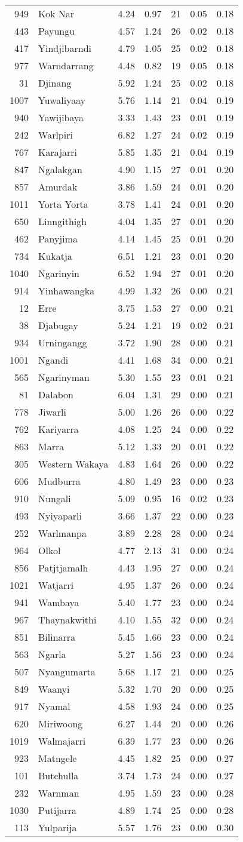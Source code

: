 \begin{longtable}[]{@{}rlrrrrr@{}}
949 & Kok Nar & 4.24 & 0.97 & 21 & 0.05 & 0.18\tabularnewline
443 & Payungu & 4.57 & 1.24 & 26 & 0.02 & 0.18\tabularnewline
417 & Yindjibarndi & 4.79 & 1.05 & 25 & 0.02 & 0.18\tabularnewline
977 & Warndarrang & 4.48 & 0.82 & 19 & 0.05 & 0.18\tabularnewline
31 & Djinang & 5.92 & 1.24 & 25 & 0.02 & 0.18\tabularnewline
1007 & Yuwaliyaay & 5.76 & 1.14 & 21 & 0.04 & 0.19\tabularnewline
940 & Yawijibaya & 3.33 & 1.43 & 23 & 0.01 & 0.19\tabularnewline
242 & Warlpiri & 6.82 & 1.27 & 24 & 0.02 & 0.19\tabularnewline
767 & Karajarri & 5.85 & 1.35 & 21 & 0.04 & 0.19\tabularnewline
847 & Ngalakgan & 4.90 & 1.15 & 27 & 0.01 & 0.20\tabularnewline
857 & Amurdak & 3.86 & 1.59 & 24 & 0.01 & 0.20\tabularnewline
1011 & Yorta Yorta & 3.78 & 1.41 & 24 & 0.01 & 0.20\tabularnewline
650 & Linngithigh & 4.04 & 1.35 & 27 & 0.01 & 0.20\tabularnewline
462 & Panyjima & 4.14 & 1.45 & 25 & 0.01 & 0.20\tabularnewline
734 & Kukatja & 6.51 & 1.21 & 23 & 0.01 & 0.20\tabularnewline
1040 & Ngarinyin & 6.52 & 1.94 & 27 & 0.01 & 0.20\tabularnewline
914 & Yinhawangka & 4.99 & 1.32 & 26 & 0.00 & 0.21\tabularnewline
12 & Erre & 3.75 & 1.53 & 27 & 0.00 & 0.21\tabularnewline
38 & Djabugay & 5.24 & 1.21 & 19 & 0.02 & 0.21\tabularnewline
934 & Urningangg & 3.72 & 1.90 & 28 & 0.00 & 0.21\tabularnewline
1001 & Ngandi & 4.41 & 1.68 & 34 & 0.00 & 0.21\tabularnewline
565 & Ngarinyman & 5.30 & 1.55 & 23 & 0.01 & 0.21\tabularnewline
81 & Dalabon & 6.04 & 1.31 & 29 & 0.00 & 0.21\tabularnewline
778 & Jiwarli & 5.00 & 1.26 & 26 & 0.00 & 0.22\tabularnewline
762 & Kariyarra & 4.08 & 1.25 & 24 & 0.00 & 0.22\tabularnewline
863 & Marra & 5.12 & 1.33 & 20 & 0.01 & 0.22\tabularnewline
305 & Western Wakaya & 4.83 & 1.64 & 26 & 0.00 & 0.22\tabularnewline
606 & Mudburra & 4.80 & 1.49 & 23 & 0.00 & 0.23\tabularnewline
910 & Nungali & 5.09 & 0.95 & 16 & 0.02 & 0.23\tabularnewline
493 & Nyiyaparli & 3.66 & 1.37 & 22 & 0.00 & 0.23\tabularnewline
252 & Warlmanpa & 3.89 & 2.28 & 28 & 0.00 & 0.24\tabularnewline
964 & Olkol & 4.77 & 2.13 & 31 & 0.00 & 0.24\tabularnewline
856 & Patjtjamalh & 4.43 & 1.95 & 27 & 0.00 & 0.24\tabularnewline
1021 & Watjarri & 4.95 & 1.37 & 26 & 0.00 & 0.24\tabularnewline
941 & Wambaya & 5.40 & 1.77 & 23 & 0.00 & 0.24\tabularnewline
967 & Thaynakwithi & 4.10 & 1.55 & 32 & 0.00 & 0.24\tabularnewline
851 & Bilinarra & 5.45 & 1.66 & 23 & 0.00 & 0.24\tabularnewline
563 & Ngarla & 5.27 & 1.56 & 23 & 0.00 & 0.24\tabularnewline
507 & Nyangumarta & 5.68 & 1.17 & 21 & 0.00 & 0.25\tabularnewline
849 & Waanyi & 5.32 & 1.70 & 20 & 0.00 & 0.25\tabularnewline
917 & Nyamal & 4.58 & 1.93 & 24 & 0.00 & 0.25\tabularnewline
620 & Miriwoong & 6.27 & 1.44 & 20 & 0.00 & 0.26\tabularnewline
1019 & Walmajarri & 6.39 & 1.77 & 23 & 0.00 & 0.26\tabularnewline
923 & Matngele & 4.45 & 1.82 & 25 & 0.00 & 0.27\tabularnewline
101 & Butchulla & 3.74 & 1.73 & 24 & 0.00 & 0.27\tabularnewline
232 & Warnman & 4.95 & 1.59 & 23 & 0.00 & 0.28\tabularnewline
1030 & Putijarra & 4.89 & 1.74 & 25 & 0.00 & 0.28\tabularnewline
113 & Yulparija & 5.57 & 1.76 & 23 & 0.00 & 0.30\tabularnewline
\bottomrule
\end{longtable}

